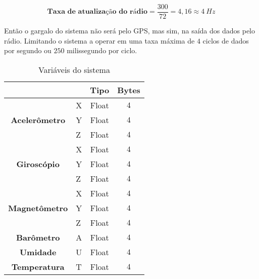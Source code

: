 \begin{equation}
    \textbf{Taxa de atualização do rádio} = \frac{300}{72} = 4,16 \approx 4 \ Hz
\end{equation}


 Então o gargalo do sistema não será pelo GPS, mas sim, na saída dos dados pelo rádio. Limitando o sistema a operar em uma taxa máxima de $4$ ciclos de dados por segundo ou $250$ milissegundo por ciclo.











\begin{table}[!thb]
	\centering
	\caption{\label{Tamanho_Variavel}Variáveis do sistema}
	\begin{tabular}{ll|c|c|}
		\\ \cline{3-4}
		 & \multicolumn{1}{c|}{\textbf{}} & \textbf{Tipo}   & \textbf{Bytes} 
		\\ \hline
		\multicolumn{1}{|c|}{\multirow{3}{*}{\textbf{Acelerômetro}}} & X & Float & $4$ 
		\\ \cline{2-4}
		\multicolumn{1}{|l|}{} & Y & Float & $4$ 
		\\ \cline{2-4}
	    \multicolumn{1}{|l|}{} & Z & Float & $4$ 
		\\ \hline
		
		\multicolumn{1}{|c|}{\multirow{3}{*}{\textbf{Giroscópio}}} & X & Float & $4$  
		\\ \cline{2-4}
		\multicolumn{1}{|l|}{} & Y & Float & $4$ 
		\\ \cline{2-4}
	    \multicolumn{1}{|l|}{} & Z & Float & $4$ 
		\\ \hline	

		\multicolumn{1}{|c|}{\multirow{3}{*}{\textbf{Magnetômetro}}} & X & Float & $4$  
		\\ \cline{2-4}
		\multicolumn{1}{|l|}{} & Y & Float & $4$ 
		\\ \cline{2-4}
	    \multicolumn{1}{|l|}{} & Z & Float & $4$ 
		\\ \hline			
		
		\multicolumn{1}{|c|}{\textbf{Barômetro}} & A & Float & $4$ 
		\\ \hline

		\multicolumn{1}{|c|}{\textbf{Umidade}} & U & Float & $4$ 
		\\ \hline		
		
		\multicolumn{1}{|c|}{\textbf{Temperatura}} & T & Float & $4$ 
		\\ \hline		


\end{tabular}
\end{table}
